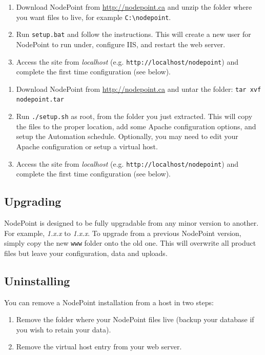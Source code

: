 \documentclass[11pt]{article}
\begin{document}
{
\begin{enumerate}
\item Download NodePoint from \url{http://nodepoint.ca} and unzip the folder where you want files to live, for example \texttt{C:\textbackslash nodepoint}.
\item Run \texttt{setup.bat} and follow the instructions. This will create a new user for NodePoint to run under, configure IIS, and restart the web server.
\item Access the site from \textit{localhost} (e.g. \texttt{http://localhost/nodepoint}) and complete the first time configuration (see below).
\end{enumerate}
}
{
\begin{enumerate}
\item Download NodePoint from \url{http://nodepoint.ca} and untar the folder: \texttt{tar xvf nodepoint.tar}
\item Run \texttt{./setup.sh} as root, from the folder you just extracted. This will copy the files to the proper location, add some Apache configuration options, and setup the Automation schedule. Optionally, you may need to edit your Apache configuration or setup a virtual host.
\item Access the site from \textit{localhost} (e.g. \texttt{http://localhost/nodepoint}) and complete the first time configuration (see below).
\end{enumerate}
}

\subsection{Upgrading}
NodePoint is designed to be fully upgradable from any minor version to another. For example, \textit{1.x.x} to \textit{1.x.x}. To upgrade from a previous NodePoint version, simply copy the new \texttt{www} folder onto the old one. This will overwrite all product files but leave your configuration, data and uploads.

\subsection{Uninstalling}
You can remove a NodePoint installation from a host in two steps:
\begin{enumerate}
\item Remove the folder where your NodePoint files live (backup your database if you wish to retain your data).
\item Remove the virtual host entry from your web server.
\end{enumerate}
\end{document}
